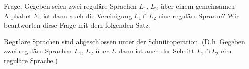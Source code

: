 %                 


Frage: Gegeben seien zwei reguläre Sprachen $L_1$, $L_2$ über einem gemeinsamen Alphabet $\Sigma$; ist dann auch die Vereinigung $L_1\cap L_2$ eine reguläre Sprache? Wir beantworten diese Frage mit dem folgenden Satz.

\begin{Satz}
  Reguläre Sprachen sind abgeschlossen unter der Schnittoperation. (D.h. Gegeben zwei reguläre Sprachen $L_1$, $L_2$ über $\Sigma$ dann ist auch der Schnitt $L_1\cap L_2$ eine reguläre Sprache.)
\end{Satz}

